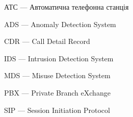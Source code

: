 \newpage
{}
\begin{ESKDexplanation}
  \item АТС --- Автоматична телефонна станція
  \item ADS --- Anomaly Detection System
  \item CDR --- Call Detail Record
  \item IDS --- Intrusion Detection System
  \item MDS --- Misuse Detection System
  \item PBX --- Private Branch eXchange
  \item SIP --- Session Initiation Protocol
\end{ESKDexplanation}
